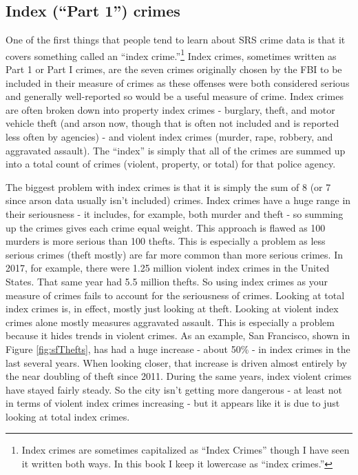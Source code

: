 \documentclass[
]{krantz}
\begin{document}
\subsection{Index (``Part 1'') crimes}\label{indexCrimes}

One of the first things that people tend to learn about SRS
crime data is that it covers something called an ``index
crime.''\footnote{Index crimes are sometimes capitalized as
  ``Index Crimes'' though I have seen it written both ways.
  In this book I keep it lowercase as ``index crimes.''}
Index crimes, sometimes written as Part 1 or Part I crimes,
are the seven crimes originally chosen by the FBI to be
included in their measure of crimes as these offenses were
both considered serious and generally well-reported so would
be a useful measure of crime. Index crimes are often broken
down into property index crimes - burglary, theft, and motor
vehicle theft (and arson now, though that is often not
included and is reported less often by agencies) - and
violent index crimes (murder, rape, robbery, and aggravated
assault). The ``index'' is simply that all of the crimes are
summed up into a total count of crimes (violent, property,
or total) for that police agency.

The biggest problem with index crimes is that it is simply
the sum of 8 (or 7 since arson data usually isn't included)
crimes. Index crimes have a huge range in their seriousness
- it includes, for example, both murder and theft - so
summing up the crimes gives each crime equal weight. This
approach is flawed as 100 murders is more serious than 100
thefts. This is especially a problem as less serious crimes
(theft mostly) are far more common than more serious crimes.
In 2017, for example, there were 1.25 million violent index
crimes in the United States. That same year had 5.5 million
thefts. So using index crimes as your measure of crimes
fails to account for the seriousness of crimes. Looking at
total index crimes is, in effect, mostly just looking at
theft. Looking at violent index crimes alone mostly measures
aggravated assault. This is especially a problem because it
hides trends in violent crimes. As an example, San
Francisco, shown in Figure \ref{fig:sfThefts}, has had a
huge increase - about 50\% - in index crimes in the last
several years. When looking closer, that increase is driven
almost entirely by the near doubling of theft since 2011.
During the same years, index violent crimes have stayed
fairly steady. So the city isn't getting more dangerous - at
least not in terms of violent index crimes increasing - but
it appears like it is due to just looking at total index
crimes.
\end{document}
